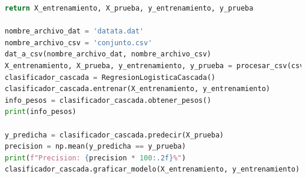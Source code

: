 \documentclass[12pt]{article}
\begin{document}
\begin{lstlisting}[language=Python]
    return X_entrenamiento, X_prueba, y_entrenamiento, y_prueba

nombre_archivo_dat = 'datata.dat'
nombre_archivo_csv = 'conjunto.csv'
dat_a_csv(nombre_archivo_dat, nombre_archivo_csv)
X_entrenamiento, X_prueba, y_entrenamiento, y_prueba = procesar_csv(csv_a_datos('conjunto.csv'))
clasificador_cascada = RegresionLogisticaCascada()
clasificador_cascada.entrenar(X_entrenamiento, y_entrenamiento)
info_pesos = clasificador_cascada.obtener_pesos()
print(info_pesos)

y_predicha = clasificador_cascada.predecir(X_prueba)
precision = np.mean(y_predicha == y_prueba)
print(f"Precision: {precision * 100:.2f}%")
clasificador_cascada.graficar_modelo(X_entrenamiento, y_entrenamiento)

\end{lstlisting}
\end{document}
